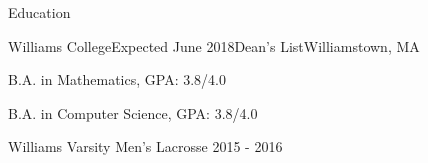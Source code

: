 \documentclass{resume} %
\begin{document}

\begin{rSection}{Education}
  \begin{rSubsection}{Williams College}{Expected June 2018}{Dean's List}{Williamstown, MA}
    \item B.A. in Mathematics, GPA: 3.8/4.0
    \item B.A. in Computer Science, GPA: 3.8/4.0
    \item Williams Varsity Men's Lacrosse 2015 - 2016
  \end{rSubsection}
\end{rSection}

\end{document}
